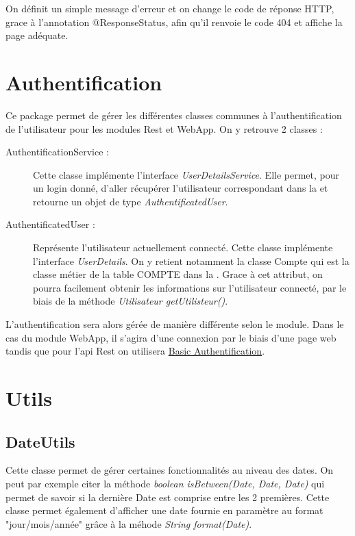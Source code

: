 		On définit un simple message d'erreur et on change le code de réponse HTTP, grace à l'annotation @ResponseStatus, afin qu'il renvoie le code 404 et affiche la page adéquate.

	\newpage
	\section{Authentification}
		\label{sec:core_authentification}

		Ce package permet de gérer les différentes classes communes à l'authentification de l'utilisateur pour les modules Rest et WebApp. On y retrouve 2 classes :

		\begin{description}
		   \item[AuthentificationService :]{Cette classe implémente l'interface \textit{UserDetailsService}. Elle permet, pour un login donné, d'aller récupérer l'utilisateur correspondant dans la \bdd{} et retourne un objet de type \textit{AuthentificatedUser}.}
		   \item[AuthentificatedUser :]{Représente l'utilisateur actuellement connecté. Cette classe implémente l'interface \textit{UserDetails}. On y retient notamment la classe Compte qui est la classe métier de la table COMPTE dans la \bdd{}. Grace à cet attribut, on pourra facilement obtenir les informations sur l'utilisateur connecté, par le biais de la méthode \textit{Utilisateur getUtilisteur()}.}
	   \end{description}

	   L'authentification sera alors gérée de manière différente selon le module. Dans le cas du module WebApp, il s'agira d'une connexion par le biais d'une page web tandis que pour l'api Rest on utilisera \href{https://fr.wikipedia.org/wiki/Authentification\_HTTP#M%C3%A9thode\_%C2%AB\_Basic\_%C2%BB}{Basic Authentification}.

	\section{Utils}

		\subsection{DateUtils}

			Cette classe permet de gérer certaines fonctionnalités au niveau des dates. On peut par exemple citer la méthode \textit{boolean isBetween(Date, Date, Date)} qui permet de savoir si la dernière Date est comprise entre les 2 premières. Cette classe permet également d'afficher une date fournie en paramètre au format "jour/mois/année" grâce à la méhode \textit{String format(Date)}.

